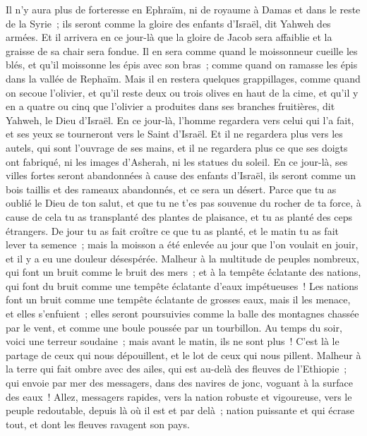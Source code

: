 \begin{multicols}{2}
Il n'y aura plus de forteresse en Ephraïm, ni de royaume à Damas et dans le reste de la Syrie~; ils seront comme la gloire des enfants d'Israël, dit Yahweh des armées.
Et il arrivera en ce jour-là que la gloire de Jacob sera affaiblie et la graisse de sa chair sera fondue.
Il en sera comme quand le moissonneur cueille les blés, et qu'il moissonne les épis avec son bras~; comme quand on ramasse les épis dans la vallée de Rephaïm.
Mais il en restera quelques grappillages, comme quand on secoue l'olivier, et qu'il reste deux ou trois olives en haut de la cime, et qu'il y en a quatre ou cinq que l'olivier a produites dans ses branches fruitières, dit Yahweh, le Dieu d'Israël.
En ce jour-là, l'homme regardera vers celui qui l'a fait, et ses yeux se tourneront vers le Saint d'Israël.
Et il ne regardera plus vers les autels, qui sont l'ouvrage de ses mains, et il ne regardera plus ce que ses doigts ont fabriqué, ni les images d'Asherah, ni les statues du soleil.
En ce jour-là, ses villes fortes seront abandonnées à cause des enfants d'Israël, ils seront comme un bois taillis et des rameaux abandonnés, et ce sera un désert.
Parce que tu as oublié le Dieu de ton salut, et que tu ne t'es pas souvenue du rocher de ta force, à cause de cela tu as transplanté des plantes de plaisance, et tu as planté des ceps étrangers.
De jour tu as fait croître ce que tu as planté, et le matin tu as fait lever ta semence~; mais la moisson a été enlevée au jour que l'on voulait en jouir, et il y a eu une douleur désespérée.
Malheur à la multitude de peuples nombreux, qui font un bruit comme le bruit des mers~; et à la tempête éclatante des nations, qui font du bruit comme une tempête éclatante d'eaux impétueuses~!
Les nations font un bruit comme une tempête éclatante de grosses eaux, mais il les menace, et elles s'enfuient~; elles seront poursuivies comme la balle des montagnes chassée par le vent, et comme une boule poussée par un tourbillon.
Au temps du soir, voici une terreur soudaine~; mais avant le matin, ils ne sont plus~! C'est là le partage de ceux qui nous dépouillent, et le lot de ceux qui nous pillent.
\VerseOne{}Malheur à la terre qui fait ombre avec des ailes, qui est au-delà des fleuves de l'Ethiopie~;
qui envoie par mer des messagers, dans des navires de jonc, voguant à la surface des eaux~! Allez, messagers rapides, vers la nation robuste et vigoureuse, vers le peuple redoutable, depuis là où il est et par delà~; nation puissante et qui écrase tout, et dont les fleuves ravagent son pays.

\end{multicols}

